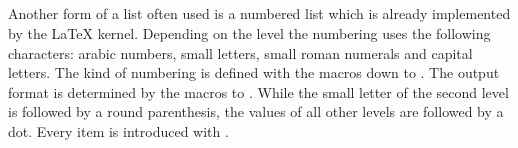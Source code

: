 \begin{Declaration}
  \\
  \\
  \\
  \\
  \\
  \\
  \\
  \\
  \\
\end{Declaration}%
%
%
%
%
%
%
%
%
%
%
Another form of a list often used is a numbered list which is already
implemented by the {\LaTeX} kernel. Depending on the level the
numbering uses the following characters: arabic
numbers, small letters, small roman numerals and capital letters. The
kind of numbering is defined with the macros  down to
. The output format is determined by the macros
 to . While the small letter of
the second level is followed by a round parenthesis, the values of all
other levels are followed by a dot. Every item is introduced with
.
